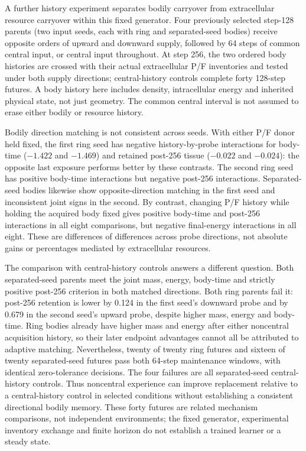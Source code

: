 \begingroup{}
A further history experiment separates bodily carryover from extracellular resource carryover within this fixed generator. Four previously selected step-128 parents (two input seeds, each with ring and separated-seed bodies) receive opposite orders of upward and downward supply, followed by 64 steps of common central input, or central input throughout. At step 256, the two ordered body histories are crossed with their actual extracellular P/F inventories and tested under both supply directions; central-history controls complete forty 128-step futures. A body history here includes density, intracellular energy and inherited physical state, not just geometry. The common central interval is not assumed to erase either bodily or resource history.\par\endgroup

Bodily direction matching is not consistent across seeds. With either P/F donor held fixed, the first ring seed has negative history-by-probe interactions for body-time ($-1.422$ and $-1.469$) and retained post-256 tissue ($-0.022$ and $-0.024$): the opposite last exposure performs better by these contrasts. The second ring seed has positive body-time interactions but negative post-256 interactions. Separated-seed bodies likewise show opposite-direction matching in the first seed and inconsistent joint signs in the second. By contrast, changing P/F history while holding the acquired body fixed gives positive body-time and post-256 interactions in all eight comparisons, but negative final-energy interactions in all eight. These are differences of differences across probe directions, not absolute gains or percentages mediated by extracellular resources.

The comparison with central-history controls answers a different question. Both separated-seed parents meet the joint mass, energy, body-time and strictly positive post-256 criterion in both matched directions. Both ring parents fail it: post-256 retention is lower by 0.124 in the first seed's downward probe and by 0.679 in the second seed's upward probe, despite higher mass, energy and body-time. Ring bodies already have higher mass and energy after either noncentral acquisition history, so their later endpoint advantages cannot all be attributed to adaptive matching. Nevertheless, twenty of twenty ring futures and sixteen of twenty separated-seed futures pass both 64-step maintenance windows, with identical zero-tolerance decisions. The four failures are all separated-seed central-history controls. Thus noncentral experience can improve replacement relative to a central-history control in selected conditions without establishing a consistent directional bodily memory. These forty futures are related mechanism comparisons, not independent environments; the fixed generator, experimental inventory exchange and finite horizon do not establish a trained learner or a steady state.

